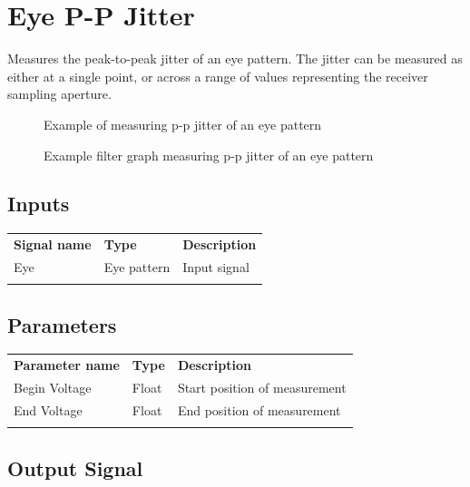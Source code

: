 \pagebreak
\section{Eye P-P Jitter}
\label{filter:eyeppj}

Measures the peak-to-peak jitter of an eye pattern. The jitter can be measured as either at a single point, or across a
range of values representing the receiver sampling aperture.

\begin{figure}[h]
\centering
{}
\caption{Example of measuring p-p jitter of an eye pattern}
\label{filter_eye_ppj}
\end{figure}

\begin{figure}[h]
\centering
{}
\caption{Example filter graph measuring p-p jitter of an eye pattern}
\label{filter_graph_eye_ppj}
\end{figure}
\FloatBarrier

\subsection{Inputs}

\begin{tabularx}{16cm}{llX}
\thickhline
\textbf{Signal name} & \textbf{Type} & \textbf{Description} \\
\thickhline
Eye & Eye pattern & Input signal\\
\thickhline
\end{tabularx}

\subsection{Parameters}

\begin{tabularx}{16cm}{llX}
\thickhline
\textbf{Parameter name} & \textbf{Type} & \textbf{Description} \\
\thickhline
Begin Voltage & Float & Start position of measurement\\
\thinhline
End Voltage & Float & End position of measurement\\
\thickhline
\end{tabularx}

\subsection{Output Signal}

